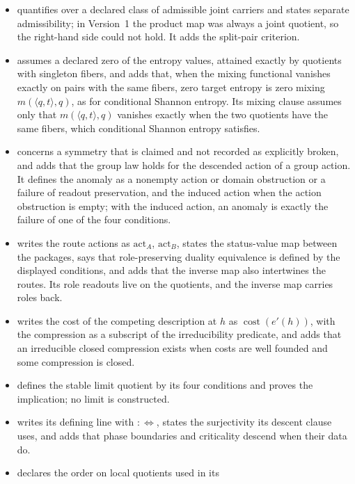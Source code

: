 \begin{itemize}
  renormalized readout; in Version~1 it was a tautology.
\item {} quantifies over a declared class of admissible joint
  carriers and states separate admissibility; in Version~1 the product map
  was always a joint quotient, so the right-hand side could not hold. It adds
  the split-pair criterion.
\item {} assumes a declared zero of the entropy values, attained
  exactly by quotients with singleton fibers, and adds that, when the mixing
  functional vanishes exactly on pairs with the same fibers, zero target
  entropy is zero mixing \(m(\langle q,t\rangle,q)\), as for conditional
  Shannon entropy. Its mixing clause assumes only that \(m(\langle q,t\rangle,q)\) vanishes exactly when the two quotients have the same fibers, which conditional Shannon entropy satisfies.
\item {} concerns a symmetry that is claimed and not recorded as
  explicitly broken, and adds that the group law holds for the descended
  action of a group action. It defines the anomaly as a nonempty action or domain obstruction or a failure of readout preservation, and the induced action when the action obstruction is empty; with the induced action, an anomaly is exactly the failure of one of the four conditions.
\item {} writes the route actions as \(\mathrm{act}_A\),
  \(\mathrm{act}_B\), states the status-value map between the packages, says
  that role-preserving duality equivalence is defined by the displayed
  conditions, and adds that the inverse map also intertwines the routes. Its role readouts live on the quotients, and the inverse map carries roles back.
\item {} writes the cost of the competing description at \(h\)
  as \(\operatorname{cost}(e'(h))\), with the compression as a subscript of
  the irreducibility predicate, and adds that an irreducible closed
  compression exists when costs are well founded and some compression is
  closed.
\item {} defines the stable limit quotient by its four conditions
  and proves the implication; no limit is constructed.
\item {} writes its defining line with \(:\Longleftrightarrow\),
  states the surjectivity its descent clause uses, and adds that phase
  boundaries and criticality descend when their data do.
\item {} declares the order on local quotients used in its

\end{itemize}
